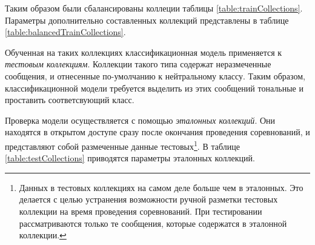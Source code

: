     Таким образом были сбалансированы коллеции таблицы \ref{table:trainCollections}.
    Параметры дополнительно составленных коллекций представлены
    в таблице \ref{table:balancedTrainCollections}.

    

    Обученная на таких коллекциях классификационная модель применяется к
    {\it тестовым коллекциям}.
    Коллекции такого типа содержат неразмеченные сообщения, и отнесенные по-умолчанию
    к нейтральному классу.
    Таким образом, классификационной модели требуется выделить из этих сообщений
    тональные и проставить соответсвующий класс.

    Проверка модели осуществляется с помощью {\it эталонных коллекций}.
    Они находятся в открытом доступе сразу после окончания проведения соревнований,
    и представляют собой размеченные данные тестовых\footnote{
        Данных в тестовых коллекциях на самом деле больше чем в эталонных.
        Это делается с целью устранения возможности ручной разметки
        тестовых коллекции на время проведения соревнований.
        При тестировании рассматриваются только те сообщения, которые содержатся
        в эталонной коллекции.
    }.
    В таблице \ref{table:testCollections} приводятся параметры эталонных коллекций.

    

